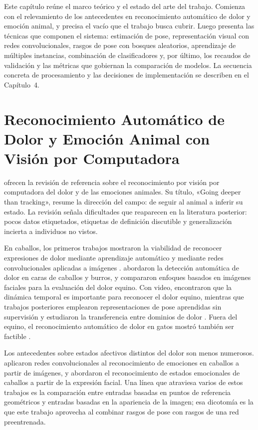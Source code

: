 
Este capítulo reúne el marco teórico y el estado del arte del trabajo. Comienza con el relevamiento de los antecedentes en reconocimiento automático de dolor y emoción animal, y precisa el vacío que el trabajo busca cubrir. Luego presenta las técnicas que componen el sistema: estimación de pose, representación visual con redes convolucionales, rasgos de pose con bosques aleatorios, aprendizaje de múltiples instancias, combinación de clasificadores y, por último, los recaudos de validación y las métricas que gobiernan la comparación de modelos. La secuencia concreta de procesamiento y las decisiones de implementación se describen en el Capítulo~4.

\section{Reconocimiento Automático de Dolor y Emoción Animal con Visión por Computadora}
\textcite{broome2023} ofrecen la revisión de referencia sobre el reconocimiento por visión por computadora del dolor y de las emociones animales. Su título, «Going deeper than tracking», resume la dirección del campo: de seguir al animal a inferir su estado. La revisión señala dificultades que reaparecen en la literatura posterior: pocos datos etiquetados, etiquetas de definición discutible y generalización incierta a individuos no vistos.

En caballos, los primeros trabajos mostraron la viabilidad de reconocer expresiones de dolor mediante aprendizaje automático \parencite{andersen2021} y mediante redes convolucionales aplicadas a imágenes \parencite{lencioni2021}. \textcite{hummel2020} abordaron la detección automática de dolor en caras de caballos y burros, y \textcite{pessanha2023} compararon enfoques basados en imágenes faciales para la evaluación del dolor equino. Con video, \textcite{broome2019} encontraron que la dinámica temporal es importante para reconocer el dolor equino, mientras que trabajos posteriores emplearon representaciones de pose aprendidas sin supervisión \parencite{rashid2022} y estudiaron la transferencia entre dominios de dolor \parencite{broome2022}. Fuera del equino, el reconocimiento automático de dolor en gatos mostró también ser factible \parencite{feighelstein2022}.

Los antecedentes sobre estados afectivos distintos del dolor son menos numerosos. \textcite{corujo2021} aplicaron redes convolucionales al reconocimiento de emociones en caballos a partir de imágenes, y \textcite{feighelstein2024} abordaron el reconocimiento de estados emocionales de caballos a partir de la expresión facial. Una línea que atraviesa varios de estos trabajos es la comparación entre entradas basadas en puntos de referencia geométricos y entradas basadas en la apariencia de la imagen; esa dicotomía es la que este trabajo aprovecha al combinar rasgos de pose con rasgos de una red preentrenada.

